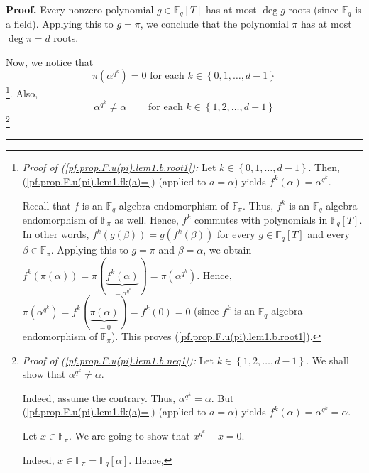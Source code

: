 \documentclass[numbers=enddot,12pt,final,onecolumn,notitlepage]{scrartcl}%
\theoremstyle{definition}
\newenvironment{proof}[1][Proof]{\noindent\textbf{#1.} }{\ \rule{0.5em}{0.5em}}
\begin{document}
\begin{proof}
Every nonzero polynomial $g\in\mathbb{F}_{q}\left[  T\right]  $ has at most
$\deg g$ roots (since $\mathbb{F}_{q}$ is a field). Applying this to $g=\pi$,
we conclude that the polynomial $\pi$ has at most $\deg\pi=d$ roots.

Now, we notice that
\begin{equation}
\pi\left(  \alpha^{q^{k}}\right)  =0\text{ for each }k\in\left\{
0,1,\ldots,d-1\right\}  \label{pf.prop.F.u(pi).lem1.b.root1}%
\end{equation}
\footnote{\textit{Proof of (\ref{pf.prop.F.u(pi).lem1.b.root1}):} Let
$k\in\left\{  0,1,\ldots,d-1\right\}  $. Then,
(\ref{pf.prop.F.u(pi).lem1.fk(a)=}) (applied to $a=\alpha$) yields
$f^{k}\left(  \alpha\right)  =\alpha^{q^{k}}$.
\par
Recall that $f$ is an $\mathbb{F}_{q}$-algebra endomorphism of $\mathbb{F}%
_{\pi}$. Thus, $f^{k}$ is an $\mathbb{F}_{q}$-algebra endomorphism of
$\mathbb{F}_{\pi}$ as well. Hence, $f^{k}$ commutes with polynomials in
$\mathbb{F}_{q}\left[  T\right]  $. In other words, $f^{k}\left(  g\left(
\beta\right)  \right)  =g\left(  f^{k}\left(  \beta\right)  \right)  $ for
every $g\in\mathbb{F}_{q}\left[  T\right]  $ and every $\beta\in
\mathbb{F}_{\pi}$. Applying this to $g=\pi$ and $\beta=\alpha$, we obtain
$f^{k}\left(  \pi\left(  \alpha\right)  \right)  =\pi\left(  \underbrace{f^{k}%
\left(  \alpha\right)  }_{=\alpha^{q^{k}}}\right)  =\pi\left(  \alpha^{q^{k}%
}\right)  $. Hence, $\pi\left(  \alpha^{q^{k}}\right)  =f^{k}\left(
\underbrace{\pi\left(  \alpha\right)  }_{=0}\right)  =f^{k}\left(  0\right)
=0$ (since $f^{k}$ is an $\mathbb{F}_{q}$-algebra endomorphism of
$\mathbb{F}_{\pi}$). This proves (\ref{pf.prop.F.u(pi).lem1.b.root1}).}.
Also,
\begin{equation}
\alpha^{q^{k}}\neq\alpha\ \ \ \ \ \ \ \ \ \ \text{for each }k\in\left\{
1,2,\ldots,d-1\right\}  \label{pf.prop.F.u(pi).lem1.b.neq1}%
\end{equation}
\footnote{\textit{Proof of (\ref{pf.prop.F.u(pi).lem1.b.neq1}):} Let
$k\in\left\{  1,2,\ldots,d-1\right\}  $. We shall show that $\alpha^{q^{k}%
}\neq\alpha$.
\par
Indeed, assume the contrary. Thus, $\alpha^{q^{k}}=\alpha$. But
(\ref{pf.prop.F.u(pi).lem1.fk(a)=}) (applied to $a=\alpha$) yields
$f^{k}\left(  \alpha\right)  =\alpha^{q^{k}}=\alpha$.
\par
Let $x\in\mathbb{F}_{\pi}$. We are going to show that $x^{q^{k}}-x=0$.
\par
Indeed, $x\in\mathbb{F}_{\pi}=\mathbb{F}_{q}\left[  \alpha\right]  $. Hence,
}
\end{proof}
\end{document}
